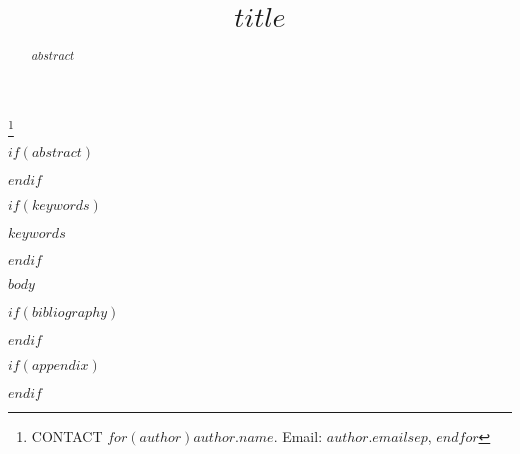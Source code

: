 \documentclass[]{interact}
\theoremstyle{plain}%
\theoremstyle{definition}
\theoremstyle{remark}
\begin{document}

\title{$title$}


\author{
}

\thanks{CONTACT $for(author)$$author.name$. Email: $author.email$$sep$, $endfor$}

\maketitle

$if(abstract)$
\begin{abstract}
$abstract$
\end{abstract}
$endif$

$if(keywords)$
\begin{keywords}
$keywords$
\end{keywords}
$endif$

$body$

$if(bibliography)$


$endif$


$if(appendix)$

$endif$
\end{document}
